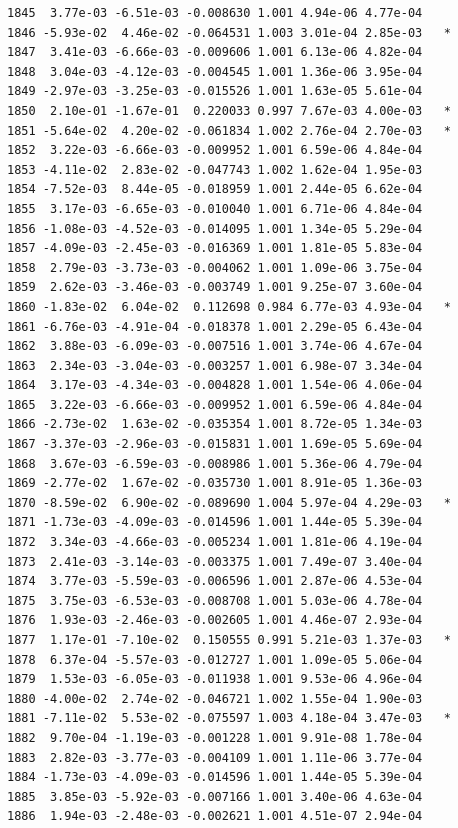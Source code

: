 \documentclass[
  letterpaper,
  DIV=11,
  numbers=noendperiod]{scrartcl}
\begin{document}
\begin{verbatim}
1845  3.77e-03 -6.51e-03 -0.008630 1.001 4.94e-06 4.77e-04    
1846 -5.93e-02  4.46e-02 -0.064531 1.003 3.01e-04 2.85e-03   *
1847  3.41e-03 -6.66e-03 -0.009606 1.001 6.13e-06 4.82e-04    
1848  3.04e-03 -4.12e-03 -0.004545 1.001 1.36e-06 3.95e-04    
1849 -2.97e-03 -3.25e-03 -0.015526 1.001 1.63e-05 5.61e-04    
1850  2.10e-01 -1.67e-01  0.220033 0.997 7.67e-03 4.00e-03   *
1851 -5.64e-02  4.20e-02 -0.061834 1.002 2.76e-04 2.70e-03   *
1852  3.22e-03 -6.66e-03 -0.009952 1.001 6.59e-06 4.84e-04    
1853 -4.11e-02  2.83e-02 -0.047743 1.002 1.62e-04 1.95e-03    
1854 -7.52e-03  8.44e-05 -0.018959 1.001 2.44e-05 6.62e-04    
1855  3.17e-03 -6.65e-03 -0.010040 1.001 6.71e-06 4.84e-04    
1856 -1.08e-03 -4.52e-03 -0.014095 1.001 1.34e-05 5.29e-04    
1857 -4.09e-03 -2.45e-03 -0.016369 1.001 1.81e-05 5.83e-04    
1858  2.79e-03 -3.73e-03 -0.004062 1.001 1.09e-06 3.75e-04    
1859  2.62e-03 -3.46e-03 -0.003749 1.001 9.25e-07 3.60e-04    
1860 -1.83e-02  6.04e-02  0.112698 0.984 6.77e-03 4.93e-04   *
1861 -6.76e-03 -4.91e-04 -0.018378 1.001 2.29e-05 6.43e-04    
1862  3.88e-03 -6.09e-03 -0.007516 1.001 3.74e-06 4.67e-04    
1863  2.34e-03 -3.04e-03 -0.003257 1.001 6.98e-07 3.34e-04    
1864  3.17e-03 -4.34e-03 -0.004828 1.001 1.54e-06 4.06e-04    
1865  3.22e-03 -6.66e-03 -0.009952 1.001 6.59e-06 4.84e-04    
1866 -2.73e-02  1.63e-02 -0.035354 1.001 8.72e-05 1.34e-03    
1867 -3.37e-03 -2.96e-03 -0.015831 1.001 1.69e-05 5.69e-04    
1868  3.67e-03 -6.59e-03 -0.008986 1.001 5.36e-06 4.79e-04    
1869 -2.77e-02  1.67e-02 -0.035730 1.001 8.91e-05 1.36e-03    
1870 -8.59e-02  6.90e-02 -0.089690 1.004 5.97e-04 4.29e-03   *
1871 -1.73e-03 -4.09e-03 -0.014596 1.001 1.44e-05 5.39e-04    
1872  3.34e-03 -4.66e-03 -0.005234 1.001 1.81e-06 4.19e-04    
1873  2.41e-03 -3.14e-03 -0.003375 1.001 7.49e-07 3.40e-04    
1874  3.77e-03 -5.59e-03 -0.006596 1.001 2.87e-06 4.53e-04    
1875  3.75e-03 -6.53e-03 -0.008708 1.001 5.03e-06 4.78e-04    
1876  1.93e-03 -2.46e-03 -0.002605 1.001 4.46e-07 2.93e-04    
1877  1.17e-01 -7.10e-02  0.150555 0.991 5.21e-03 1.37e-03   *
1878  6.37e-04 -5.57e-03 -0.012727 1.001 1.09e-05 5.06e-04    
1879  1.53e-03 -6.05e-03 -0.011938 1.001 9.53e-06 4.96e-04    
1880 -4.00e-02  2.74e-02 -0.046721 1.002 1.55e-04 1.90e-03    
1881 -7.11e-02  5.53e-02 -0.075597 1.003 4.18e-04 3.47e-03   *
1882  9.70e-04 -1.19e-03 -0.001228 1.001 9.91e-08 1.78e-04    
1883  2.82e-03 -3.77e-03 -0.004109 1.001 1.11e-06 3.77e-04    
1884 -1.73e-03 -4.09e-03 -0.014596 1.001 1.44e-05 5.39e-04    
1885  3.85e-03 -5.92e-03 -0.007166 1.001 3.40e-06 4.63e-04    
1886  1.94e-03 -2.48e-03 -0.002621 1.001 4.51e-07 2.94e-04    

\end{verbatim}
\end{document}
